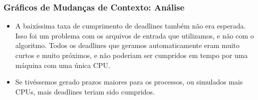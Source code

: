 \documentclass{beamer}
\begin{document}
\begin{frame}
\frametitle{Gráficos de Mudanças de Contexto: Análise}
\begin{itemize}
\item A baixíssima taxa de cumprimento de deadlines também não era esperada. Isso foi um problema com os arquivos de entrada que utilizamos, e não com o algoritmo. Todos os deadlines que geramos automaticamente eram muito curtos e muito próximos, e não poderiam ser cumpridos em tempo por uma máquina com uma única CPU.

\item Se tivéssemos gerado prazos maiores para os processos, ou simulados mais CPUs, mais deadlines teriam sido cumpridos. 
\end{itemize}
\end{frame}
\end{document}
